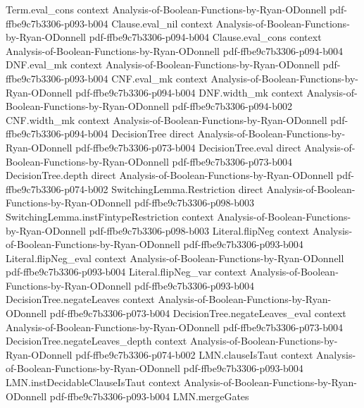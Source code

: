 \begin{lemma}
  {Term.eval_cons}
  {context}
  {Analysis-of-Boolean-Functions-by-Ryan-ODonnell}
  {pdf-ffbe9c7b3306-p093-b004}
\proofstep
  {Clause.eval_nil}
  {context}
  {Analysis-of-Boolean-Functions-by-Ryan-ODonnell}
  {pdf-ffbe9c7b3306-p094-b004}
\proofstep
  {Clause.eval_cons}
  {context}
  {Analysis-of-Boolean-Functions-by-Ryan-ODonnell}
  {pdf-ffbe9c7b3306-p094-b004}
\proofstep
  {DNF.eval_mk}
  {context}
  {Analysis-of-Boolean-Functions-by-Ryan-ODonnell}
  {pdf-ffbe9c7b3306-p093-b004}
\proofstep
  {CNF.eval_mk}
  {context}
  {Analysis-of-Boolean-Functions-by-Ryan-ODonnell}
  {pdf-ffbe9c7b3306-p094-b004}
\proofstep
  {DNF.width_mk}
  {context}
  {Analysis-of-Boolean-Functions-by-Ryan-ODonnell}
  {pdf-ffbe9c7b3306-p094-b002}
\proofstep
  {CNF.width_mk}
  {context}
  {Analysis-of-Boolean-Functions-by-Ryan-ODonnell}
  {pdf-ffbe9c7b3306-p094-b004}
\proofstep
  {DecisionTree}
  {direct}
  {Analysis-of-Boolean-Functions-by-Ryan-ODonnell}
  {pdf-ffbe9c7b3306-p073-b004}
\proofstep
  {DecisionTree.eval}
  {direct}
  {Analysis-of-Boolean-Functions-by-Ryan-ODonnell}
  {pdf-ffbe9c7b3306-p073-b004}
\proofstep
  {DecisionTree.depth}
  {direct}
  {Analysis-of-Boolean-Functions-by-Ryan-ODonnell}
  {pdf-ffbe9c7b3306-p074-b002}
\proofstep
  {SwitchingLemma.Restriction}
  {direct}
  {Analysis-of-Boolean-Functions-by-Ryan-ODonnell}
  {pdf-ffbe9c7b3306-p098-b003}
\proofstep
  {SwitchingLemma.instFintypeRestriction}
  {context}
  {Analysis-of-Boolean-Functions-by-Ryan-ODonnell}
  {pdf-ffbe9c7b3306-p098-b003}
\proofstep
  {Literal.flipNeg}
  {context}
  {Analysis-of-Boolean-Functions-by-Ryan-ODonnell}
  {pdf-ffbe9c7b3306-p093-b004}
\proofstep
  {Literal.flipNeg_eval}
  {context}
  {Analysis-of-Boolean-Functions-by-Ryan-ODonnell}
  {pdf-ffbe9c7b3306-p093-b004}
\proofstep
  {Literal.flipNeg_var}
  {context}
  {Analysis-of-Boolean-Functions-by-Ryan-ODonnell}
  {pdf-ffbe9c7b3306-p093-b004}
\proofstep
  {DecisionTree.negateLeaves}
  {context}
  {Analysis-of-Boolean-Functions-by-Ryan-ODonnell}
  {pdf-ffbe9c7b3306-p073-b004}
\proofstep
  {DecisionTree.negateLeaves_eval}
  {context}
  {Analysis-of-Boolean-Functions-by-Ryan-ODonnell}
  {pdf-ffbe9c7b3306-p073-b004}
\proofstep
  {DecisionTree.negateLeaves_depth}
  {context}
  {Analysis-of-Boolean-Functions-by-Ryan-ODonnell}
  {pdf-ffbe9c7b3306-p074-b002}
\proofstep
  {LMN.clauseIsTaut}
  {context}
  {Analysis-of-Boolean-Functions-by-Ryan-ODonnell}
  {pdf-ffbe9c7b3306-p093-b004}
\proofstep
  {LMN.instDecidableClauseIsTaut}
  {context}
  {Analysis-of-Boolean-Functions-by-Ryan-ODonnell}
  {pdf-ffbe9c7b3306-p093-b004}
\proofstep
  {LMN.mergeGates}

\end{lemma}
